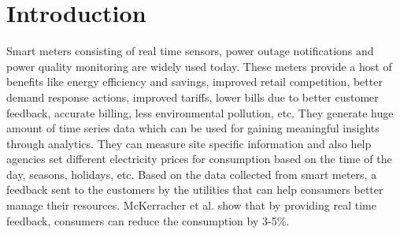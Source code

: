 \documentclass{acm_proc_article-sp}
\begin{document}





\section{Introduction}
%
%

Smart meters consisting of real time sensors, power outage notifications and power quality monitoring are widely used today. These meters provide a host of benefits like energy efficiency and savings, improved retail competition, better demand response actions, improved tariffs, lower bills due to better customer feedback, accurate billing, less environmental pollution, etc. \cite{Klopfert}
They generate huge amount of time series data which can be used for gaining meaningful insights through analytics.
They can measure site specific information and also help agencies set different electricity prices for consumption based on the time of the day, seasons, holidays, etc. Based on the data collected from smart meters, a feedback sent to the customers by the utilities that can help consumers better manage their resources. McKerracher et al. \cite{mckerracher} show that by providing real time feedback, consumers can reduce the consumption by 3-5\%.
\end{document}
